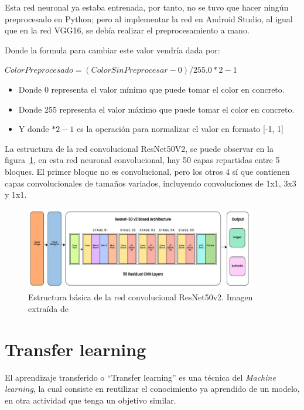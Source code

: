 Esta red neuronal ya estaba entrenada, por tanto, no se tuvo que hacer ningún preprocesado en Python; pero al implementar la red en Android Studio, al igual que en la red VGG16, se debía realizar el preprocesamiento a mano.

Donde la formula para cambiar este valor vendría dada por: 
\begin{center}
    $ColorPreprocesado = (ColorSinPreprocesar - 0)/ 255.0 * 2 - 1$
    \begin{itemize}
        \item Donde 0 representa el valor mínimo que puede tomar el color en concreto.
        \item Donde 255 representa el valor máximo que puede tomar el color en concreto.
        \item Y donde $ * 2 - 1 $ es la operación para normalizar el valor en formato [-1, 1]
    \end{itemize}
\end{center}

La estructura de la red convolucional ResNet50V2, se puede observar en la figura~\ref{fig:ResNet50v2-struct}, en esta red neuronal convolucional,  hay 50 capas repartidas entre 5 bloques. El primer bloque no es convolucional, pero los otros 4 sí que contienen capas convolucionales de tamaños variados, incluyendo convoluciones de 1x1, 3x3 y 1x1.
\begin{figure}[!ht]
         \centering
         \includegraphics[width=0.9\textwidth]{img/ResNet50v2-architecture.jpg}
         \caption{Estructura básica de la red convolucional ResNet50v2. Imagen extraída de~\cite{ResNet50v2-architecture}}
         \label{fig:ResNet50v2-struct}
\end{figure}

\section{Transfer learning}

El aprendizaje transferido o ``Transfer learning'' es una técnica del \textit{Machine learning}, la cual consiste en reutilizar el conocimiento ya aprendido de un modelo, en otra actividad que tenga un objetivo similar. 


